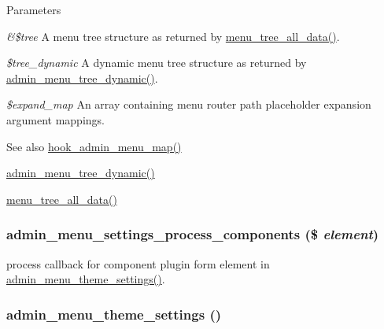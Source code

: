 \begin{DoxyParams}{Parameters}
\item[{\em \&\$tree}]A menu tree structure as returned by \hyperlink{group__menu_ga4f06528e6ed613b6a885e051035b322a}{menu\_\-tree\_\-all\_\-data()}. \item[{\em \$tree\_\-dynamic}]A dynamic menu tree structure as returned by \hyperlink{admin__menu_8inc_a84698cac1efd2078ef2763865995e226}{admin\_\-menu\_\-tree\_\-dynamic()}. \item[{\em \$expand\_\-map}]An array containing menu router path placeholder expansion argument mappings.\end{DoxyParams}
\begin{DoxySeeAlso}{See also}
\hyperlink{admin__menu_8api_8php_a4b3f2235db483f670a2e7327633868df}{hook\_\-admin\_\-menu\_\-map()} 

\hyperlink{admin__menu_8inc_a84698cac1efd2078ef2763865995e226}{admin\_\-menu\_\-tree\_\-dynamic()} 

\hyperlink{group__menu_ga4f06528e6ed613b6a885e051035b322a}{menu\_\-tree\_\-all\_\-data()} 
\end{DoxySeeAlso}
\hypertarget{admin__menu_8inc_ad849bfde07af29eb7536133da2f2b3be}{
\subsubsection[{admin\_\-menu\_\-settings\_\-process\_\-components}]{\setlength{\rightskip}{0pt plus 5cm}admin\_\-menu\_\-settings\_\-process\_\-components (\$ {\em element})}}
\label{admin__menu_8inc_ad849bfde07af29eb7536133da2f2b3be}
process callback for component plugin form element in \hyperlink{admin__menu_8inc_a4e3734f65911708ed221edc2a7007a23}{admin\_\-menu\_\-theme\_\-settings()}. \hypertarget{admin__menu_8inc_a4e3734f65911708ed221edc2a7007a23}{
\subsubsection[{admin\_\-menu\_\-theme\_\-settings}]{\setlength{\rightskip}{0pt plus 5cm}admin\_\-menu\_\-theme\_\-settings ()}}
